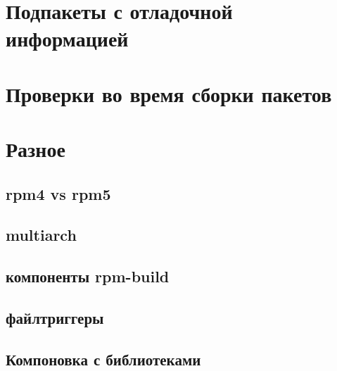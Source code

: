 \documentclass[russian,a4paper,12pt,titlepage]{article}
\begin{document}
\section{Подпакеты с отладочной информацией}

\label{debuginfo-subpackages}

\section{Проверки во время сборки пакетов}

\label{brp-verify}

\section{Разное}

\subsection{rpm4 vs rpm5}

\subsection{multiarch}

\subsection{компоненты rpm-build}

\subsection{файлтриггеры}
\label{filetriggers}

\subsection{Компоновка с библиотеками}
\label{linkning-with-libraries}
\end{document}
